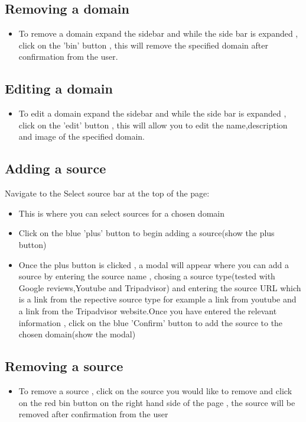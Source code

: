 \documentclass[12pt]{article}
\begin{document}
\subsection{Removing a domain}
\begin{itemize}
    \item To remove a domain expand the sidebar and while the side bar is expanded , click on the 'bin' button , this will remove the specified domain after confirmation from the user.
\end{itemize}
\subsection{Editing a domain}
\begin{itemize}
    \item To edit a domain expand the sidebar and while the side bar is expanded , click on the 'edit' button , this will allow you to edit the name,description and image of the specified domain.
\end{itemize}
\subsection{Adding a source}
Navigate to the Select source bar at the top of the page:
\begin{itemize}
    \item This is where you can select sources for a chosen domain 
    \item Click on the blue 'plus' button to begin adding a source(show the plus button)
    \item Once the plus button is clicked , a modal will appear where you can add a source by entering the source name , chosing a source type(tested with Google reviews,Youtube and Tripadvisor) and entering the source URL which is a link from the repective source type for example a link from youtube and a link from the Tripadvisor website.Once you have entered the relevant information , click on the blue 'Confirm' button to add the source to the chosen domain(show the modal)
\end{itemize}
\subsection{Removing a source}
\begin{itemize}
    \item To remove a source , click on the source you would like to remove and click on the red bin button on the right hand side of the page , the source will be removed after confirmation from the user
\end{itemize}
\end{document}
